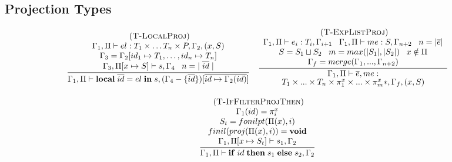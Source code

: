 \documentclass[preprint]{sigplanconf}
\newcommand{\mylabel}[1]{\; (\textsc{#1})}
\newcommand{\env}{\Gamma}
\newcommand{\penv}{\Pi}
\begin{document}
\subsection{Projection Types}
\label{sec:projections}

\begin{figure*}[t]
{\small
\label{fig:projtypes}
\[
\begin{array}{c}
\begin{array}{c}
\mylabel{T-LocalProj}\\
\dfrac{\begin{array}{c}
	\env_{1}, \penv \vdash el:T_1 \times \ldots T_n \times P, \env_{2}, (x,S)\\
	\env_{3} = \env_{2}[id_{1} \mapsto T_1, \ldots, id_{n} \mapsto T_n]\\
	\env_{3}, \penv[x \mapsto S] \vdash s, \env_{4} \;\;\;
	n = |\;\overline{id}\;|  
	\end{array}}
{\env_{1}, \penv \vdash \mathbf{local} \; \overline{id} = el \; \mathbf{in} \; s, (\env_{4}-\{\overline{id}\})[\overline{id \mapsto \env_2(id)}]}
\end{array}
\begin{array}{c}
\mylabel{T-ExpListProj}\\
\dfrac{\begin{array}{c}
	\env_{1}, \penv \vdash e_{i}:T_{i}, \env_{i+1} \;\;\;
	\env_{1}, \penv \vdash me:S, \env_{n+2} \;\;\; n=|\overline{e}|\\
	S = S_1 \sqcup S_2 \;\;\;m = max(|S_1|, |S_2|) \;\;\; x \notin \Pi\\
	\env_{f} = merge(\env_{1}, ..., \env_{n+2})
	\end{array}}
{\env_{1}, \penv \vdash \overline{e},me:}\\ {T_{1} \times ... \times T_{n} \times \pi_{1}^{x} \times ... \times \pi_{m}^{x}{*}, \env_{f}, (x,S)}
\end{array}\\\\
\begin{array}{c}
\mylabel{T-IfFilterProjThen}\\
\dfrac{\begin{array}{c}
	\env_{1}(id) = \pi_{i}^{x} \\ S_t = fonilpt(\Pi(x), i)\\ 
	finil(proj(\Pi(x), i)) = {\bf void} \\
	\env_{1}, \penv[x \mapsto S_t] \vdash s_{1}, \env_{2} 
	\end{array}}
{\env_{1}, \penv \vdash \mathbf{if} \; id \; \mathbf{then} \; s_{1} \; \mathbf{else} \; s_{2}, \env_{2}}

\end{array}
\end{array}\]}
\end{figure*}
\end{document}
